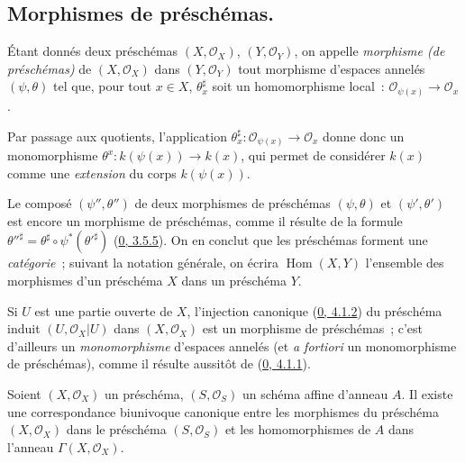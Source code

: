 \subsection{Morphismes de préschémas.}
\label{subsection:I.2.2-fr}
\label{I.2.2-fr}

\begin{definition}[2.2.1]
\label{I.2.2.1-fr}
Étant donnés deux préschémas $(X,\mathscr{O}_X)$, $(Y,\mathscr{O}_Y)$, on
appelle \emph{morphisme (de préschémas)} de $(X,\mathscr{O}_X)$ dans
$(Y,\mathscr{O}_Y)$ tout morphisme d'espaces annelés $(\psi,\theta)$ tel que,
pour tout $x\in X$, $\theta_x^\sharp$ soit un homomorphisme local~:
$\mathscr{O}_{\psi(x)}\longrightarrow\mathscr{O}_x$.
\end{definition}


Par passage aux quotients, l'application
$\theta_x^\sharp:\mathscr{O}_{\psi(x)}\to\mathscr{O}_x$ donne donc un
monomorphisme $\theta^x:k(\psi(x))\to k(x)$, qui permet de considérer $k(x)$
comme une \emph{extension} du corps $k(\psi(x))$.

\begin{env}[2.2.2]
\label{I.2.2.2-fr}
Le composé $(\psi'',\theta'')$ de deux morphismes de préschémas
$(\psi,\theta)$ et $(\psi',\theta')$ est encore un morphisme de préschémas,
comme il résulte de la formule
${\theta''}^\sharp=\theta^\sharp\circ\psi^*({\theta'}^\sharp)$
(\hyperref[0.3.5.5-fr]{0, 3.5.5}). On en conclut que les préschémas forment
une \emph{catégorie}~; suivant la notation générale, on écrira
$\operatorname{Hom}(X,Y)$ l'ensemble des morphismes d'un préschéma $X$ dans
un préschéma $Y$.
\end{env}

\begin{example}[2.2.3]
\label{I.2.2.3-fr}
Si $U$ est une partie ouverte de $X$, l'injection canonique
(\hyperref[0.4.1.2-fr]{0, 4.1.2}) du préschéma induit
$(U,\mathscr{O}_X|U)$ dans $(X,\mathscr{O}_X)$ est un morphisme de
préschémas~; c'est d'ailleurs un \emph{monomorphisme} d'espaces annelés (et
\emph{a fortiori} un monomorphisme de préschémas), comme il résulte aussitôt
de (\hyperref[0.4.1.1-fr]{0, 4.1.1}).
\end{example}

\begin{proposition}[2.2.4]
\label{I.2.2.4-fr}
Soient $(X,\mathscr{O}_X)$ un préschéma, $(S,\mathscr{O}_S)$ un schéma affine
d'anneau $A$. Il existe une correspondance biunivoque canonique entre les
morphismes du préschéma $(X,\mathscr{O}_X)$ dans le préschéma
$(S,\mathscr{O}_S)$ et les homomorphismes de $A$ dans l'anneau
$\Gamma(X,\mathscr{O}_X)$.
\end{proposition}

